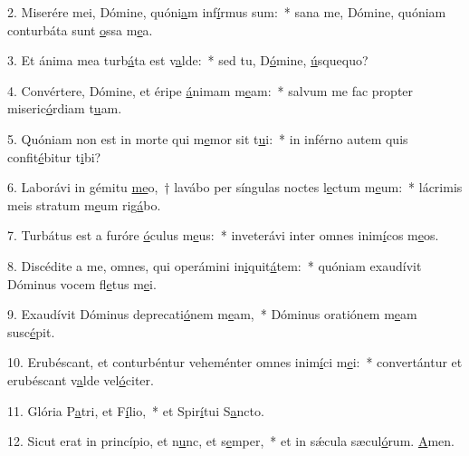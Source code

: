 2. Miserére mei, Dómine, quóni\uline{a}m inf\uline{í}rmus sum:~* sana me, Dómine, quóniam conturbáta sunt \uline{o}ssa m\uline{e}a.\par 
3. Et ánima mea turb\uline{á}ta est v\uline{a}lde:~* sed tu, D\uline{ó}mine, \uline{ú}squequo?\par 
4. Convértere, Dómine, et éripe \uline{á}nimam m\uline{e}am:~* salvum me fac propter miseric\uline{ó}rdiam t\uline{u}am.\par 
5. Quóniam non est in morte qui m\uline{e}mor sit t\uline{u}i:~* in inférno autem quis confit\uline{é}bitur t\uline{i}bi?\par 
6. Laborávi in gémitu \uline{me}o,~† lavábo per síngulas noctes l\uline{e}ctum m\uline{e}um:~* lácrimis meis stratum m\uline{e}um rig\uline{á}bo.\par 
7. Turbátus est a furóre \uline{ó}culus m\uline{e}us:~* inveterávi inter omnes inim\uline{í}cos m\uline{e}os.\par 
8. Discédite a me, omnes, qui operámini in\uline{i}quit\uline{á}tem:~* quóniam exaudívit Dóminus vocem fl\uline{e}tus m\uline{e}i.\par 
9. Exaudívit Dóminus deprecati\uline{ó}nem m\uline{e}am,~* Dóminus oratiónem m\uline{e}am susc\uline{é}pit.\par 
10. Erubéscant, et conturbéntur veheménter omnes inim\uline{í}ci m\uline{e}i:~* convertántur et erubéscant v\uline{a}lde vel\uline{ó}citer.\par 
11. Glória P\uline{a}tri, et F\uline{í}lio,~* et Spir\uline{í}tui S\uline{a}ncto.\par 
12. Sicut erat in princípio, et n\uline{u}nc, et s\uline{e}mper,~* et in sǽcula sæcul\uline{ó}rum. \uline{A}men.\par 
